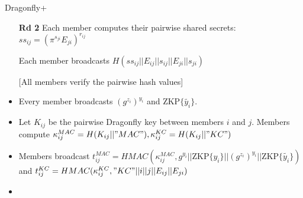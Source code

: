 \documentclass{beamer}
\theoremstyle{definition}
\begin{document}
\begin{frame}{Dragonfly+}
    \begin{itemize}
        \item[\textbf{Rd 2}] Each member computes their pairwise shared secrets: $ss_{ij} = (\pi^{s_{ji}} E_{ji})^{r_{ij}}$
        \item[] Each member broadcasts $H(ss_{ij} || E_{ij} || s_{ij} || E_{ji} || s_{ji})$
        \item[] [All members verify the pairwise hash values]
        
        \item<2->[\textbf{Rd 3}] Every member broadcasts $(g^{z_i})^{y_i}$ and $\text{ZKP}\{\tilde{y_i}\}$.
        \item<2->[] Let $K_{ij}$ be the pairwise Dragonfly key between members $i$ and $j$. Members compute
            $\kappa_{ij}^{MAC} = H(K_{ij} || "MAC"), \kappa_{ij}^{KC} = H(K_{ij} || "KC")$
        \item<2->[] Members broadcast $t_{ij}^{MAC} = HMAC(\kappa_{ij}^{MAC},  g^{y_i} || \text{ZKP}\{y_i\} || (g^{z_i})^{y_i} || \text{ZKP}\{\tilde{y_i}\})$
            and $t_{ij}^{KC} = HMAC(\kappa_{ij}^{KC}, "KC" || i || j || E_{ij} || E_{ji})$
        \item<2->[] [All members verify $\text{ZKP}\{\tilde{y_i}\}$, $t_{ji}^{MAC}$ and $t_{ij}^{KC}$ are correct]
    \end{itemize}
\end{frame}



\end{document}
